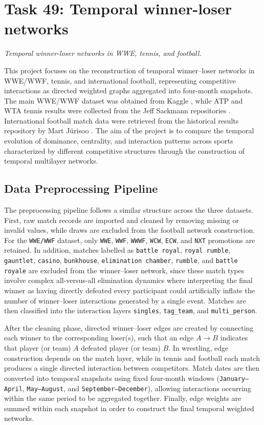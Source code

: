 \chapter{Task 49: Temporal winner-loser networks}


\noindent\textcolor{unipd}{\textit{Temporal winner-loser networks in WWE, tennis, and football.}}

This project focuses on the reconstruction of temporal winner--loser networks in WWE/WWF, tennis, and international football, representing competitive interactions as directed weighted graphs aggregated into four-month snapshots. The main WWE/WWF dataset was obtained from Kaggle \cite{wwe_dataset}, while ATP and WTA tennis results were collected from the Jeff Sackmann repositories \cite{atp_dataset,wta_dataset}. International football match data were retrieved from the historical results repository by Mart Jürisoo \cite{football_dataset}. The aim of the project is to compare the temporal evolution of dominance, centrality, and interaction patterns across sports characterized by different competitive structures through the construction of temporal multilayer networks.


\section{Data Preprocessing Pipeline}

The preprocessing pipeline follows a similar structure across the three datasets. First, raw match records are imported and cleaned by removing missing or invalid values, while draws are excluded from the football network construction. For the \texttt{WWE/WWF} dataset, only 
\texttt{WWE}, \texttt{WWF}, \texttt{WWWF}, \texttt{WCW}, \texttt{ECW}, and \texttt{NXT}
promotions are retained. In addition, matches labelled as \texttt{battle royal}, \texttt{royal rumble}, \texttt{gauntlet}, \texttt{casino}, \texttt{bunkhouse}, \texttt{elimination chamber}, \texttt{rumble}, and \texttt{battle royale} are excluded from the winner--loser network, since these match types involve complex all-versus-all elimination dynamics where interpreting the final winner as having directly defeated every participant could artificially inflate the number of winner--loser interactions generated by a single event. Matches are then classified into the interaction layers \texttt{singles}, \texttt{tag\_team}, and \texttt{multi\_person}.

After the cleaning phase, directed winner--loser edges are created by connecting each winner to the corresponding loser(s), such that an edge $A \rightarrow B$ indicates that player (or team) $A$ defeated player (or team) $B$. In wrestling, edge construction depends on the match layer, while in tennis and football each match produces a single directed interaction between competitors. Match dates are then converted into temporal snapshots using fixed four-month windows (\texttt{January--April}, \texttt{May--August}, and \texttt{September--December}), allowing interactions occurring within the same period to be aggregated together. Finally, edge weights are summed within each snapshot in order to construct the final temporal weighted networks.

